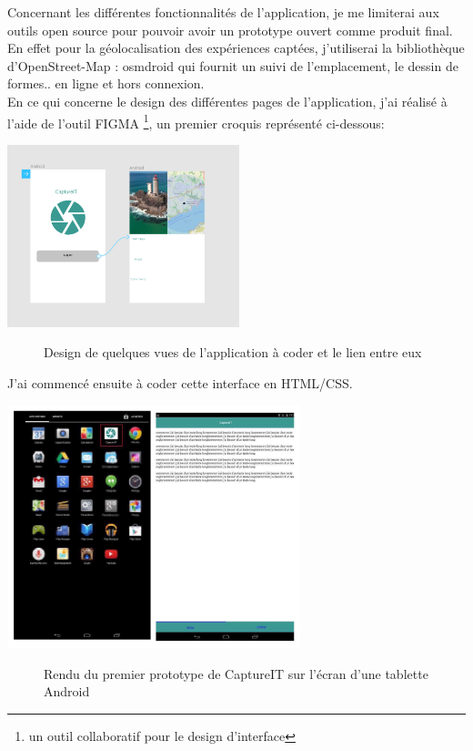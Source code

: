 \documentclass{report}
\begin{document}
Concernant les différentes fonctionnalités de l’application, je me limiterai aux outils open source pour pouvoir avoir un prototype ouvert comme produit final. En effet pour la géolocalisation des expériences captées, j’utiliserai la bibliothèque d’OpenStreet-Map : osmdroid qui fournit un suivi de l’emplacement, le dessin de formes.. en ligne et hors connexion. \\
En ce qui concerne le design des différentes pages de l’application, j'ai réalisé à l’aide de l’outil FIGMA \footnote{un outil collaboratif pour le design d'interface}, un premier croquis représenté ci-dessous:

\begin{center}
\includegraphics[height=150pt]{CaptureIT.png}
\end{center}
\begin{figure}[H]
    \centering
    \caption{Design de quelques vues de l'application à coder et le lien entre eux}
    \label{fig:CaptureIT}
\end{figure}

J'ai commencé ensuite à coder cette interface en HTML/CSS. \\

\begin{center}
\includegraphics[height=200pt]{screen.jpg}
\end{center}
\begin{figure}[H]
    \centering
    \caption{Rendu du premier prototype de CaptureIT sur l'écran d'une tablette Android}
    \label{fig:CaptureIT}
\end{figure}
\end{document}

